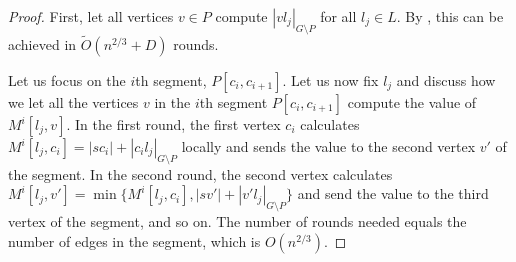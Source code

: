 \begin{proof}
First, let all vertices $v \in P$ compute  $|vl_j|_{G \setminus P}$ for all $l_j \in L$. By , this can be achieved in $\widetilde{O}(n^{2/3}+D)$ rounds.


Let us focus on the $i$th segment, $P[c_{i},c_{i+1}]$.
Let us now fix $l_j$ and discuss how we let all the vertices $v$ in the $i$th segment $P[c_{i},c_{i+1}]$ compute the value of $M^i[l_j,v]$.  In the first round, the first vertex $c_{i}$ calculates $M^i[l_j,c_{i}] = |sc_i| + |c_i l_j|_{G \setminus P}$ locally and sends the value to the second vertex $v'$ of the segment. In the second round, the second vertex calculates $M^i[l_j,v']=\min\{M^i[l_j,c_{i}], |sv'| + |v' l_j|_{G \setminus P}\}$ and send the value to the third vertex of the segment, and so on. The number of rounds needed equals the number of edges in the segment, which is $O(n^{2/3})$.



\end{proof}
